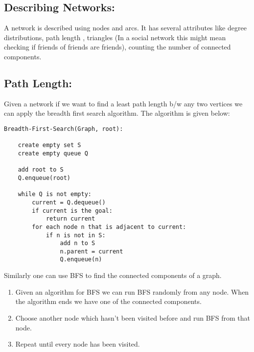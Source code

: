 \subsection{Describing Networks:}
A network is described using nodes and arcs. It has several attributes like degree distributions, path length , triangles (In a social network this might mean checking if friends of friends are friends), counting the number of connected components.

\subsection{Path Length:}

Given a network if we want to find a least path length b/w any two vertices we can apply the breadth first search algorithm. The algorithm is given below:
\begin{verbatim}
Breadth-First-Search(Graph, root):
    
    create empty set S
    create empty queue Q      

    add root to S
    Q.enqueue(root)                      

    while Q is not empty:
        current = Q.dequeue()
        if current is the goal:
            return current
        for each node n that is adjacent to current:
            if n is not in S:
                add n to S
                n.parent = current
                Q.enqueue(n)
\end{verbatim}



Similarly one can use BFS to find the connected components of a graph. 

\begin{enumerate}
\item Given an algorithm for BFS we can run BFS randomly from any node. When the algorithm ends we have one of the connected components.
\item Choose another node which hasn't been visited before and run BFS from that node.
\item Repeat until every node has been visited.
\end{enumerate}   
